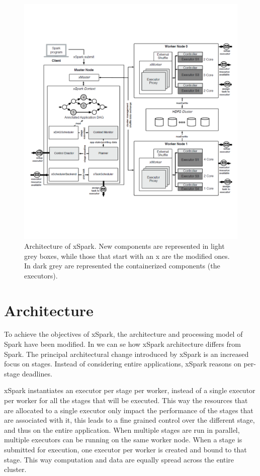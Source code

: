 \begin{figure}[t]
	\vspace{-0.5cm}
	\centering
	\includegraphics[width=\columnwidth]{Images/xspark_architecture.pdf}  
	\vspace{-3cm}
	\caption[Architecture of xSpark.]{Architecture of xSpark. New components are represented in light grey boxes, while those that start with an x are the modified ones. In dark grey are represented the containerized components (the executors).}
	\label{fig:xSparkArchitecture}
\end{figure}
\section{Architecture}\label{sec:architecture}

To achieve the objectives of xSpark, the architecture and processing model of Spark have been modified. In  we can se how xSpark architecture differs from Spark. The principal architectural change introduced by xSpark is an increased focus on stages. Instead of considering entire applications, xSpark reasons on per-stage deadlines. 

xSpark instantiates an executor per stage per worker, instead of a single executor per worker for all the stages that will be executed. This way the resources that are allocated to a single executor only impact the performance of the stages that are associated with it, this leads to a fine grained control over the different stage, and thus on the entire application. When 
multiple stages are run in parallel, multiple executors can be running on the same worker node. When a stage is submitted for execution, one executor per worker is created and bound to that stage. This way computation and data are equally spread across the entire cluster.

